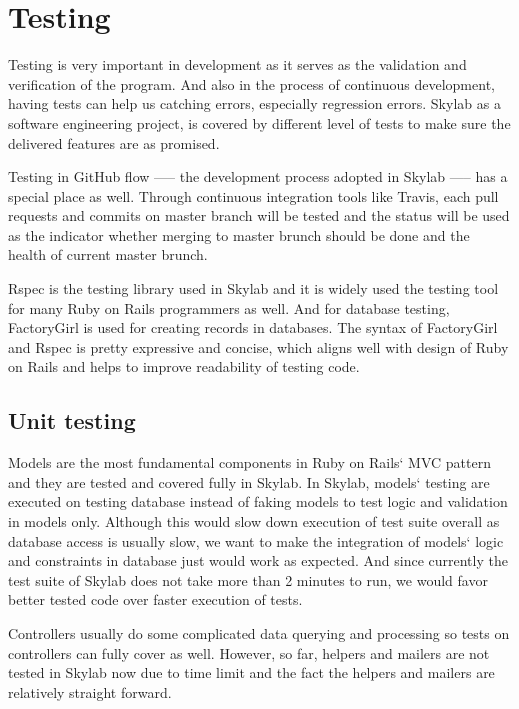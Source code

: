 \chapter{Testing} \label{testing}

Testing is very important in development as it serves as the validation and verification of the program\cite{citationtesting}. And also in the process of continuous development, having tests can help us catching errors, especially regression errors. Skylab as a software engineering project, is covered by different level of tests to make sure the delivered features are as promised.

Testing in GitHub flow —-- the development process adopted in Skylab —-- has a special place as well. Through continuous integration tools like Travis, each pull requests and commits on master branch will be tested and the status will be used as the indicator whether merging to master brunch should be done and the health of current master brunch.

Rspec is the testing library used in Skylab and it is widely used the testing tool for many Ruby on Rails programmers as well\cite{citationrspec}. And for database testing, FactoryGirl is used for creating records in databases. The syntax of FactoryGirl and Rspec is pretty expressive and concise, which aligns well with design of Ruby on Rails and helps to improve readability of testing code.

\section{Unit testing} \label{unittesting}

Models are the most fundamental components in Ruby on Rails` MVC pattern and they are tested and covered fully in Skylab. In Skylab, models` testing are executed on testing database instead of faking models to test logic and validation in models only. Although this would slow down execution of test suite overall as database access is usually slow, we want to make the integration of models` logic and constraints in database just would work as expected. And since currently the test suite of Skylab does not take more than 2 minutes to run, we would favor better tested code over faster execution of tests.

Controllers usually do some complicated data querying and processing so tests on controllers can fully cover as well. However, so far, helpers and mailers are not tested in Skylab now due to time limit and the fact the helpers and mailers are relatively straight forward.

